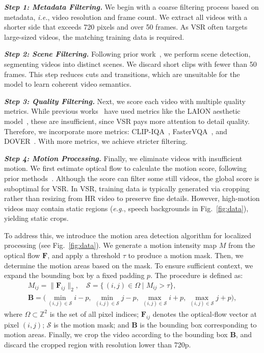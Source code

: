 \documentclass{article}
\newcommand\eg{\textit{e.g.}}
\newcommand\ie{\textit{i.e.}}
\begin{document}
\textbf{\textit{Step 1: Metadata Filtering.}}
We begin with a coarse filtering process based on metadata, \ie, video resolution and frame count. We extract all videos with a shorter side that exceeds 720 pixels and over 50 frames. As VSR often targets large-sized videos, the matching training data is required.

\textbf{\textit{Step 2: Scene Filtering.}}
Following prior work~\cite{blattmann2023stable}, we perform scene detection, segmenting videos into distinct scenes. We discard short clips with fewer than 50 frames. This step reduces cuts and transitions, which are unsuitable for the model to learn coherent video semantics.

\textbf{\textit{Step 3: Quality Filtering.}}
Next, we score each video with multiple quality metrics. While previous works~\cite{opensora,nan2024openvid} have used metrics like the LAION aesthetic model~\cite{schuhmann2022laion}, these are insufficient, since VSR pays more attention to detail quality. Therefore, we incorporate more metrics: CLIP-IQA~\cite{wang2023exploring}, FasterVQA~\cite{wu2023neighbourhood}, and DOVER~\cite{wu2023exploring}. With more metrics, we achieve stricter filtering.

\textbf{\textit{Step 4: Motion Processing.}}
Finally, we eliminate videos with insufficient motion. We first estimate optical flow to calculate the motion score, following prior methods~\cite{opensora,blattmann2023stable}. Although the score can filter some still videos, the global score is suboptimal for VSR. In VSR, training data is typically generated via cropping rather than resizing from HR video to preserve fine details. However, high-motion videos may contain static regions (\eg, speech backgrounds in Fig.~\ref{fig:data}), yielding static crops. 

To address this, we introduce the motion area detection algorithm for localized processing (see Fig.~\ref{fig:data}). We generate a motion intensity map $M$ from the optical flow $\mathbf{F}$, and apply a threshold $\tau$ to produce a motion mask. Then, we determine the motion areas based on the mask. To ensure sufficient context, we expand the bounding box by a fixed padding $p$. The procedure is defined as:
\begin{equation}
\begin{gathered}
M_{ij} = \lVert \mathbf{F}_{ij} \rVert_{2},\quad
\mathcal{S} = \{\, (i,j) \in \Omega \mid M_{ij} > \tau \},
\\
\mathbf{B} = \bigl(
  \min_{(i,j)\in \mathcal{S}} i - p,\,
  \min_{(i,j)\in \mathcal{S}} j - p,\,
  \max_{(i,j)\in \mathcal{S}} i + p,\,
  \max_{(i,j)\in \mathcal{S}} j + p
\bigr),
\end{gathered}
\end{equation}
where $\Omega$$\subset$$\mathbb{Z}^2$ is the set of all pixel indices; $\mathbf{F}_{ij}$ denotes the optical‑flow vector at pixel $(i,j)$; $\mathcal{S}$ is the motion mask; and $\mathbf{B}$ is the bounding box corresponding to motion areas.
Finally, we crop the video according to the bounding box $\mathbf{B}$, and discard the cropped region with resolution lower than 720p.
\end{document}
